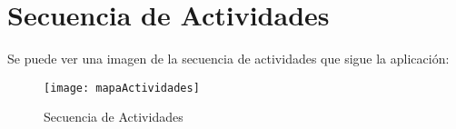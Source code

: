 %
%
%
%

\cleardoublepage
\chapter{Secuencia de Actividades}
\label{chap:activitiesSecuence}

Se puede ver una imagen de la secuencia de actividades que sigue la aplicación:

\begin{figure}[h !]
	\centering
	\texttt{[image: mapaActividades]}
	\caption{Secuencia de Actividades}
	\label{fig:ActivitiesSecuence}
\end{figure}